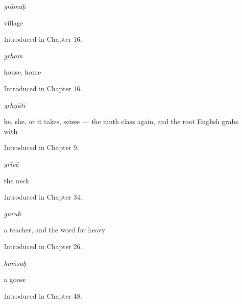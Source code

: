 \noindent\begin{minipage}[t]{\linewidth}
\raggedright
\textbf{}\enspace\emph{grāmaḥ}\par
\small village\par
\footnotesize Introduced in Chapter 16.
\end{minipage}\par\medskip

\noindent\begin{minipage}[t]{\linewidth}
\raggedright
\textbf{}\enspace\emph{gṛham}\par
\small house, home\par
\footnotesize Introduced in Chapter 16.
\end{minipage}\par\medskip

\noindent\begin{minipage}[t]{\linewidth}
\raggedright
\textbf{}\enspace\emph{gṛhṇāti}\par
\small he, she, or it takes, seizes — the ninth class again, and the root English grabs with\par
\footnotesize Introduced in Chapter 9.
\end{minipage}\par\medskip

\noindent\begin{minipage}[t]{\linewidth}
\raggedright
\textbf{}\enspace\emph{grīvā}\par
\small the neck\par
\footnotesize Introduced in Chapter 34.
\end{minipage}\par\medskip

\noindent\begin{minipage}[t]{\linewidth}
\raggedright
\textbf{}\enspace\emph{guruḥ}\par
\small a teacher, and the word for heavy\par
\footnotesize Introduced in Chapter 26.
\end{minipage}\par\medskip

\noindent\begin{minipage}[t]{\linewidth}
\raggedright
\textbf{}\enspace\emph{haṁsaḥ}\par
\small a goose\par
\footnotesize Introduced in Chapter 48.
\end{minipage}\par\medskip


